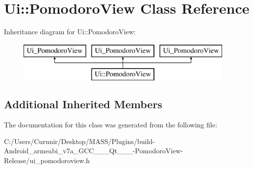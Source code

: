 \hypertarget{class_ui_1_1_pomodoro_view}{}\section{Ui\+:\+:Pomodoro\+View Class Reference}
\label{class_ui_1_1_pomodoro_view}
Inheritance diagram for Ui\+:\+:Pomodoro\+View\+:\begin{figure}[H]
\begin{center}
\leavevmode
\includegraphics[height=2.000000cm]{class_ui_1_1_pomodoro_view}
\end{center}
\end{figure}
\subsection*{Additional Inherited Members}


The documentation for this class was generated from the following file\+:\begin{DoxyCompactItemize}
\item 
C\+:/\+Users/\+Curunir/\+Desktop/\+M\+A\+S\+S/\+Plugins/build-\/\+Android\+\_\+armeabi\+\_\+v7a\+\_\+\+G\+C\+C\+\_\+\_\+\_\+\+Qt\+\_\+\_\+\_-\/\+Pomodoro\+View-\/\+Release/ui\+\_\+pomodoroview.\+h\end{DoxyCompactItemize}
